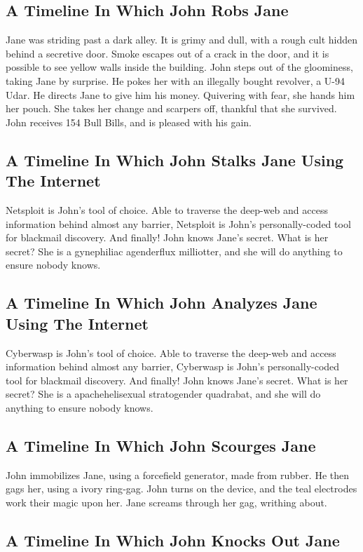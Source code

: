 \documentclass{article}
\begin{document}
\subsection{A Timeline In Which John Robs Jane}


Jane was striding past a dark alley.
It is grimy and dull, with a rough cult hidden behind a secretive door.
Smoke escapes out of a crack in the door, and it is possible to see yellow walls inside the building.
John steps out of the gloominess, taking Jane by surprise.
He pokes her with an illegally bought revolver, a U{-}94 Udar.
He directs Jane to give him his money.
Quivering with fear, she hands him her pouch.
She takes her change and scarpers off, thankful that she survived.
John receives 154 Bull Bills, and is pleased with his gain.
\subsection{A Timeline In Which John Stalks Jane Using The Internet}


Netsploit is John's tool of choice. Able to traverse the deep{-}web and access information behind almost any barrier, Netsploit is John's personally{-}coded tool for blackmail discovery.
And finally!
John knows Jane's secret. What is her secret? She is a gynephiliac agenderflux milliotter, and she will do anything to ensure nobody knows.
\subsection{A Timeline In Which John Analyzes Jane Using The Internet}


Cyberwasp is John's tool of choice. Able to traverse the deep{-}web and access information behind almost any barrier, Cyberwasp is John's personally{-}coded tool for blackmail discovery.
And finally!
John knows Jane's secret. What is her secret? She is a apachehelisexual stratogender quadrabat, and she will do anything to ensure nobody knows.
\subsection{A Timeline In Which John Scourges Jane}


John immobilizes Jane, using a forcefield generator, made from rubber.
He then gags her, using a ivory ring{-}gag.
John turns on the device, and the teal electrodes work their magic upon her.
Jane screams through her gag, writhing about.
\subsection{A Timeline In Which John Knocks Out Jane}
\end{document}
